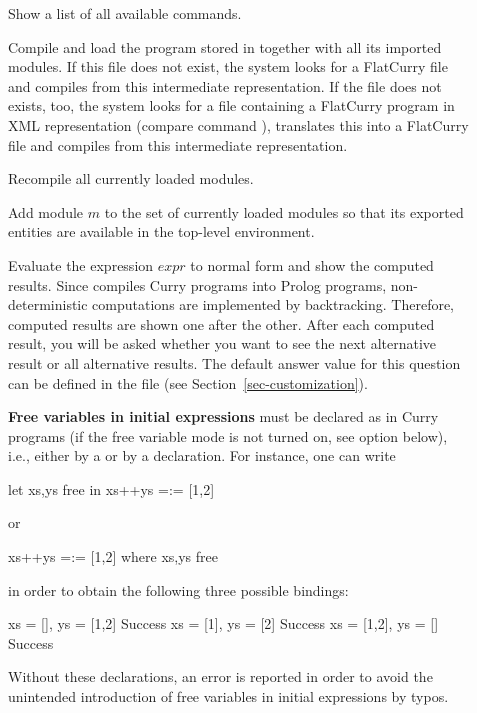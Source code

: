 \begin{description}
\item[]
Show a list of all available commands.

\item[]
Compile and load the program stored in 
together with all its imported modules.
If this file does not exist, the system looks for a FlatCurry
file  and compiles from this intermediate representation.
If the file  does not exists, too, the system looks
for a file  containing a FlatCurry program in
XML representation (compare command ),
translates this into a FlatCurry file 
and compiles from this intermediate representation.

\item[]
Recompile all currently loaded modules.

\item[]
Add module $m$ to the set of currently loaded modules
so that its exported entities are available in the top-level environment.

\item[] Evaluate the expression $expr$ to normal form
and show the computed results. Since \CYS
compiles Curry programs into Prolog programs,
non-deterministic computations are implemented by backtracking.
Therefore, computed results are shown one after the other.
After each computed result, you will be asked whether
you want to see the next alternative result or all alternative results.
The default answer value for this question can be defined
in the  file (see Section~\ref{sec-customization}).

\textbf{Free variables in initial expressions} must be declared as in Curry programs
(if the free variable mode is not turned on,
see option  below), i.e.,
either by a 
or by a  declaration.
For instance, one can write
\begin{curry}
let xs,ys free in xs++ys =:= [1,2]
\end{curry}
or
\begin{curry}
xs++ys =:= [1,2]  where xs,ys free
\end{curry}
in order to obtain the following three possible bindings:
\begin{curry}
{xs = [], ys = [1,2]} Success
{xs = [1], ys = [2]} Success
{xs = [1,2], ys = []} Success
\end{curry}
Without these declarations, an error is reported in order to
avoid the unintended introduction of free variables in initial expressions
by typos.


\end{description}
